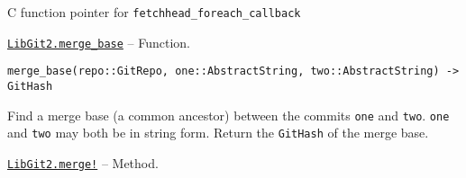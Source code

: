\begin{adjustwidth}{2em}{0pt}

C function pointer for \texttt{fetchhead\_foreach\_callback}



\end{adjustwidth}
\hypertarget{2535753121792845073}{} 
\hyperlink{2535753121792845073}{\texttt{LibGit2.merge\_base}}  -- {Function.}

\begin{adjustwidth}{2em}{0pt}


\begin{verbatim}
merge_base(repo::GitRepo, one::AbstractString, two::AbstractString) -> GitHash
\end{verbatim}

Find a merge base (a common ancestor) between the commits \texttt{one} and \texttt{two}. \texttt{one} and \texttt{two} may both be in string form. Return the \texttt{GitHash} of the merge base.



\end{adjustwidth}
\hypertarget{1187901033925205953}{} 
\hyperlink{1187901033925205953}{\texttt{LibGit2.merge!}}  -- {Method.}

